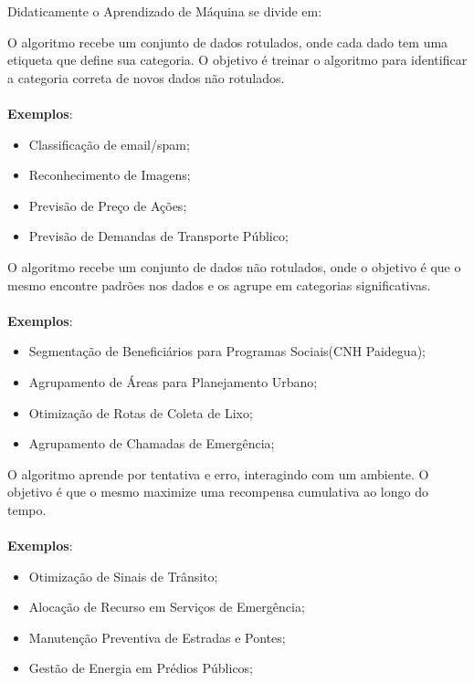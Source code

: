Didaticamente o Aprendizado de Máquina se divide em:\vskip0.3cm


O algoritmo recebe um conjunto de dados rotulados, onde cada dado tem uma etiqueta que define sua categoria. O objetivo é treinar o algoritmo para identificar a categoria correta de novos dados não rotulados. 
    \\  
    \\
\textbf{Exemplos}: 
\begin{itemize}
\item Classificação de email/spam;
\item Reconhecimento de Imagens;
\item Previsão de Preço de Ações;
\item Previsão de Demandas de Transporte Público;
\end{itemize}

\newpage
{}
O algoritmo recebe um conjunto de dados não rotulados, onde o objetivo é que o mesmo encontre padrões nos dados e os agrupe em categorias significativas. 
\\ 
\\
\textbf{Exemplos}: 
\begin{itemize}
\item Segmentação de Beneficiários para Programas Sociais(CNH Paidegua);
\item Agrupamento de Áreas para Planejamento Urbano;
\item Otimização de Rotas de Coleta de Lixo;
\item Agrupamento de Chamadas de Emergência;
\end{itemize}


O algoritmo aprende por tentativa e erro, interagindo com um ambiente. O objetivo é que o mesmo maximize uma recompensa cumulativa ao longo do tempo.
\\
\\
\textbf{Exemplos}:
\begin{itemize}
\item Otimização de Sinais de Trânsito;
\item Alocação de Recurso em Serviços de Emergência;
\item Manutenção Preventiva de Estradas e Pontes;
\item Gestão de Energia em Prédios Públicos;
\end{itemize}

